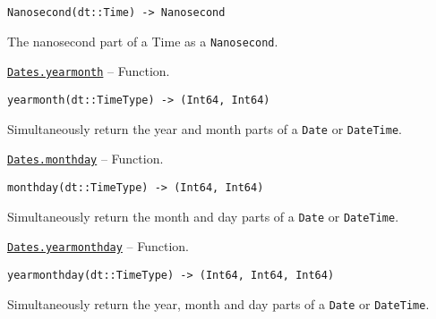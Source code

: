 \begin{adjustwidth}{2em}{0pt}


\begin{verbatim}
Nanosecond(dt::Time) -> Nanosecond
\end{verbatim}

The nanosecond part of a Time as a \texttt{Nanosecond}.



\end{adjustwidth}
\hypertarget{1408650772715600889}{} 
\hyperlink{1408650772715600889}{\texttt{Dates.yearmonth}}  -- {Function.}

\begin{adjustwidth}{2em}{0pt}


\begin{verbatim}
yearmonth(dt::TimeType) -> (Int64, Int64)
\end{verbatim}

Simultaneously return the year and month parts of a \texttt{Date} or \texttt{DateTime}.



\end{adjustwidth}
\hypertarget{17847736901982891967}{} 
\hyperlink{17847736901982891967}{\texttt{Dates.monthday}}  -- {Function.}

\begin{adjustwidth}{2em}{0pt}


\begin{verbatim}
monthday(dt::TimeType) -> (Int64, Int64)
\end{verbatim}

Simultaneously return the month and day parts of a \texttt{Date} or \texttt{DateTime}.



\end{adjustwidth}
\hypertarget{18225305010779633841}{} 
\hyperlink{18225305010779633841}{\texttt{Dates.yearmonthday}}  -- {Function.}

\begin{adjustwidth}{2em}{0pt}


\begin{verbatim}
yearmonthday(dt::TimeType) -> (Int64, Int64, Int64)
\end{verbatim}

Simultaneously return the year, month and day parts of a \texttt{Date} or \texttt{DateTime}.



\end{adjustwidth}

